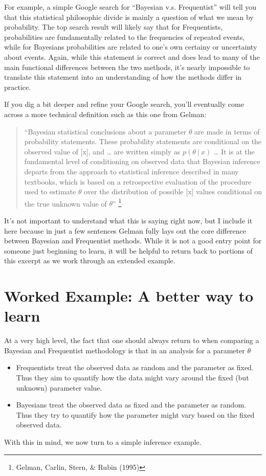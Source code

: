 \documentclass[12pt,twoside]{reedthesis}
\begin{document}
For example, a simple Google search for ``Bayesian v.s. Frequentist'' will tell you that this statistical philosophic divide is mainly a question of what we mean by probability. The top search result will likely say that for Frequentists, probabilities are fundamentally related to the frequencies of repeated events, while for Bayesians probabilities are related to one's own certainy or uncertainty about events. Again, while this statement is correct and does lead to many of the main functional differences between the two methods, it's nearly impossible to translate this statement into an understanding of how the methods differ in practice.

If you dig a bit deeper and refine your Google search, you'll eventually come across a more technical definition such as this one from Gelman:
\begin{quote}
``Bayesian statistical conclusions about a parameter \(\theta\) are made in terms of probability statements. These probability statements are conditional on the observed value of {[}x{]}, and \ldots{} are written simply as \(p(\theta \ | \ x)\) \ldots{} It is at the fundamental level of conditioning on observed data that Bayesian inference departs from the approach to statistical inference described in many textbooks, which is based on a retrospective evaluation of the procedure used to estimate \(\theta\) over the distribution of possible {[}x{]} values conditional on the true unknown value of \(\theta\)'' \footnote{Gelman, Carlin, Stern, \& Rubin (1995)}
\end{quote}
It's not important to understand what this is saying right now, but I include it here because in just a few sentences Gelman fully lays out the core difference between Bayesian and Frequentist methods. While it is not a good entry point for someone just beginning to learn, it will be helpful to return back to portions of this excerpt as we work through an extended example.

\hypertarget{worked-example-a-better-way-to-learn}{%
\section{Worked Example: A better way to learn}\label{worked-example-a-better-way-to-learn}}

At a very high level, the fact that one should always return to when comparing a Bayesian and Frequentist methodology is that in an analysis for a parameter \(\theta\)
\begin{itemize}
\item
  Frequentists treat the observed data as random and the parameter as fixed. Thus they aim to quantify how the data might vary around the fixed (but unknown) parameter value.
\item
  Bayesians treat the observed data as fixed and the parameter as random. Thus they try to quantify how the parameter might vary based on the fixed observed data.
\end{itemize}
With this in mind, we now turn to a simple inference example.
\end{document}
